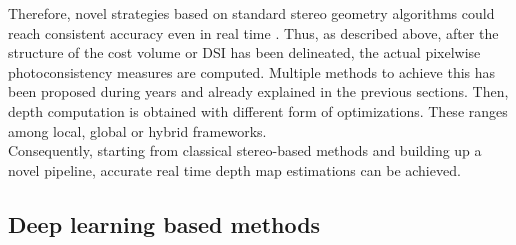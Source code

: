 Therefore, novel strategies based on standard stereo geometry algorithms could reach consistent accuracy even in real time \cite{Hernandez-Juarez2016}.
Thus, as described above, after the structure of the cost volume or DSI has been delineated, the actual pixelwise photoconsistency measures are computed.
Multiple methods to achieve this has been proposed during years and already explained in the previous sections.
Then, depth computation is obtained with different form of optimizations. 
These ranges among local, global or hybrid frameworks. \\
Consequently, starting from classical stereo-based methods and building up a novel pipeline, accurate real time depth map estimations can be achieved.

\subsection{Deep learning based methods}
\label{subsection:deep-learn-meth}

